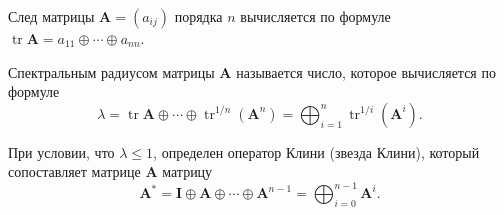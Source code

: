 \documentclass[specialist, substylefile = spbureport.rtx,
    subf,href,colorlinks=true, 12pt]{disser}
\begin{document}
        След матрицы $\bm{A}=(a_{ij})$ порядка $n$ вычисляется по формуле $\mathop\mathrm{tr}\bm{A}=a_{11}\oplus\cdots\oplus a_{nn}$.

        Спектральным радиусом матрицы $\bm{A}$ называется число, которое вычисляется по формуле
        \begin{equation*}
        \lambda
        =
        \mathop\mathrm{tr}\bm{A}\oplus\cdots\oplus\mathop\mathrm{tr}\nolimits^{1/n}(\bm{A}^{n})
        =
        \bigoplus_{i=1}^{n}{\mathop\mathrm{tr}}^{1/i}(\bm{A}^{i}).
        \end{equation*}

        При условии, что $\lambda\leq1$, определен оператор Клини (звезда Клини), который сопоставляет матрице $\bm{A}$ матрицу
        \begin{equation*}
        \bm{A}^{\ast}
        =
        \bm{I}\oplus\bm{A}\oplus\cdots\oplus\bm{A}^{n-1}
        =
        \bigoplus_{i=0}^{n-1}\bm{A}^{i}.
        \end{equation*}
\end{document}
